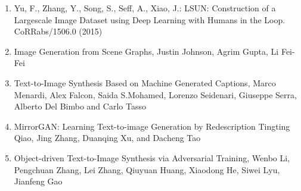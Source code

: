 \documentclass{article}
\begin{document}
\begin{enumerate}
\item Yu, F., Zhang, Y., Song, S., Seff, A., Xiao, J.: {LSUN:} Construction of a Largescale Image Dataset using Deep Learning with Humans in the Loop. CoRRabs/1506.0 (2015)
\item Image Generation from Scene Graphs,
      Justin Johnson, Agrim Gupta, Li Fei-Fei
\item Text-to-Image Synthesis Based on Machine Generated Captions, Marco Menardi, Alex Falcon, Saida S.Mohamed, Lorenzo Seidenari, Giuseppe Serra, Alberto Del Bimbo and Carlo Tasso
\item MirrorGAN: Learning Text-to-image Generation by Redescription Tingting Qiao, Jing Zhang, Duanqing Xu, and Dacheng Tao
\item Object-driven Text-to-Image Synthesis via Adversarial Training, Wenbo Li, Pengchuan Zhang, Lei Zhang, Qiuyuan Huang, Xiaodong He, Siwei Lyu, Jianfeng Gao


\end{enumerate}
\end{document}
